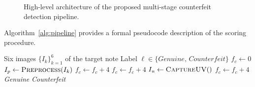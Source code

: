 \documentclass[journal]{IEEEtran}
\begin{document}
\begin{figure}[!t]
\centering
\setlength{\fboxsep}{8pt}
\caption{High-level architecture of the proposed multi-stage counterfeit detection pipeline.}
\label{fig:workflow}
\end{figure}

Algorithm~\ref{alg:pipeline} provides a formal pseudocode description of the scoring procedure.

\begin{algorithm}[!t]
\small
\caption{Multi-Feature Counterfeit Detection}
\label{alg:pipeline}
\begin{algorithmic}[1]
\Require Six images $\{I_k\}_{k=1}^{6}$ of the target note
\Ensure Label $\ell \in \{\textit{Genuine},\,\textit{Counterfeit}\}$
\State $f_c \leftarrow 0$
  \State $I_p \leftarrow \textsc{Preprocess}(I_k)$
    \State $f_c \leftarrow f_c + 4$
  \EndIf
    \State $f_c \leftarrow f_c + 4$
  \EndIf
  \State $I_u \leftarrow \textsc{CaptureUV}()$
    \State $f_c \leftarrow f_c + 4$
  \EndIf
\EndFor
{}
  \State \Return \textit{Genuine}
\Else
  \State \Return \textit{Counterfeit}
\EndIf
\end{algorithmic}
\end{algorithm}
\end{document}
